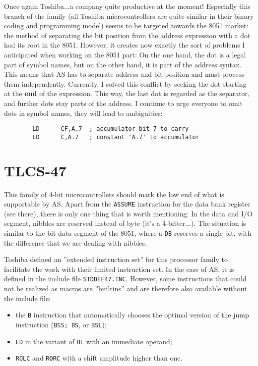 \documentclass[12pt,twoside]{report}
\newcommand{\bb}[1]{{\bf #1}}
\newcommand{\tty}[1]{{\tt #1}}
\begin{document}
Once again Toshiba...a company quite productive at the moment! 
Especially this branch of the family (all Toshiba microcontrollers
are quite similar in their binary coding and programming model) seems
to be targeted towards the 8051 market: the method of separating the
bit position from the address expression with a dot had its root in
the 8051.  However, it creates now exactly the sort of problems I
anticipated when working on the 8051 part: On the one hand, the dot
is a legal part of symbol names, but on the other hand, it is part of
the address syntax.  This means that AS has to separate address and
bit position and must process them independently.  Currently, I
solved this conflict by seeking the dot starting at the \bb{end} of the
expression.  This way, the last dot is regarded as the separator, and
further dots stay parts of the address.   I continue to urge everyone
to omit dots in symbol names, they will lead to ambiguities:
\begin{verbatim}
        LD      CF,A.7  ; accumulator bit 7 to carry
        LD      C,A.7   ; constant 'A.7' to accumulator
\end{verbatim}


\section{TLCS-47}

This family of 4-bit microcontrollers should mark the low end of what
is supportable by AS.  Apart from the \tty{ASSUME} instruction for the data
bank register (see there), there is only one thing that is worth
mentioning: In the data and I/O segment, nibbles are reserved instead
of byte (it's a 4-bitter...).  The situation is similar to the bit
data segment of the 8051, where a \tty{DB} reserves a single bit, with the
difference that we are dealing with nibbles.

Toshiba defined an ''extended instruction set'' for this processor
family to facilitate the work with their limited instruction set.  In
the case of AS, it is defined in the include file \tty{STDDEF47.INC}. 
However, some instructions that could not be realized as macros are
''builtins'' and are therefore also available without the include file:
\begin{itemize}
\item{the \tty{B} instruction that automatically chooses the optimal version
      of the jump instruction (\tty{BSS; BS}, or \tty{BSL});}
\item{\tty{LD} in the variant of \tty{HL} with an immediate operand;}
\item{\tty{ROLC} and \tty{RORC} with a shift amplitude higher than one.}
\end{itemize}
\end{document}
